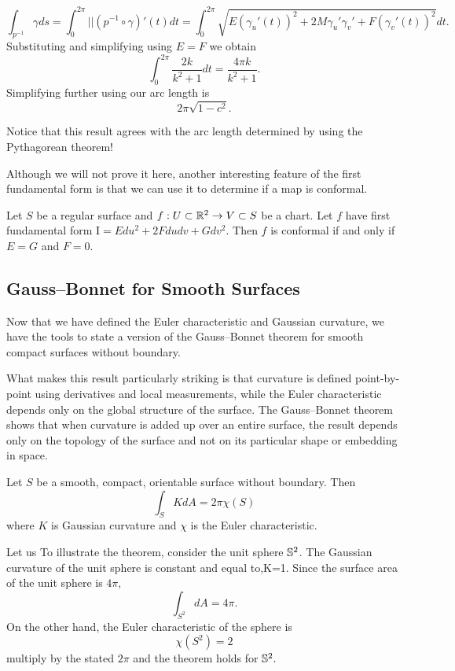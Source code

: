 \begin{example}
$$\int_{p^{-1}}\gamma ds=\int_{0}^{2\pi} ||(p^{-1}\circ \gamma)'(t)dt=\int_0^{2\pi}\sqrt{E(\gamma_u'(t))^2+2M\gamma_u'\gamma_v'+
F(\gamma_v'(t))^2}dt.$$
Substituting and simplifying using $E=F$ we obtain
$$\int_0^{2\pi}\frac{2k}{k^2+1}dt=\frac{4\pi k}{k^2+1}.$$
Simplifying further using   our arc length is
$$2\pi\sqrt{1-c^2}.$$

Notice that this result agrees with the arc length determined by using
the Pythagorean theorem!

\end{example}


Although we will not prove it here, another interesting feature of the first fundamental form is 
that we can use it to determine if a map is conformal.
\begin{theorem}\label{thm:first-conformal}
	Let $S$ be a regular surface and $f:U\subset \mathbb{R}^2 \to V\subset S$ be a chart.
	Let $f$ have first fundamental form $\mathrm{I}=Edu^2+2Fdudv +Gdv^2$.
	Then $f$ is conformal if and only if $E=G$ and $F=0.$
\end{theorem}
\subsection{Gauss--Bonnet for Smooth Surfaces}

Now that we have defined the Euler characteristic and Gaussian curvature, we
have the tools to state a version of the Gauss--Bonnet theorem for smooth compact surfaces
without boundary. 

What makes this result particularly striking is that curvature is defined point-by-point using derivatives and local measurements, while the Euler characteristic depends only on the global structure of the surface. The Gauss--Bonnet theorem shows that when curvature is added up over an entire surface, the result depends only on the topology of the surface and not on its particular shape or embedding in space.

\begin{theorem} \label{thm:g-b-nb}

Let $S$ be a smooth, compact, orientable surface without boundary. Then
	$$\int_{S} K dA = 2\pi \chi(S)$$
	where  $K$ is Gaussian curvature and
	$\chi$ is the Euler characteristic.
\end{theorem}

Let us To illustrate the theorem, consider the unit sphere $\mathbb{S}^2$. The Gaussian curvature of the unit sphere is constant and equal to,K=1. Since the surface area of the unit sphere is $4\pi$,
$$\int_{S^2} dA=4\pi.$$
On the other hand, the Euler characteristic of the sphere is
$$\chi(S^2)=2$$
multiply by the stated $2\pi$ and the theorem holds for $\mathbb{S}^2.$

